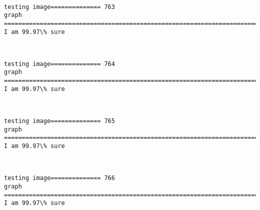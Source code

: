 \documentclass[11pt]{article}
\begin{document}
    \begin{center}
    \end{center}
    { \hspace*{\fill} \\}
    
    \begin{Verbatim}[commandchars=\\\{\}]
testing image============== 763
graph
============================================================================
I am 99.97\% sure

    \end{Verbatim}

    \begin{center}
    \end{center}
    { \hspace*{\fill} \\}
    
    \begin{Verbatim}[commandchars=\\\{\}]
testing image============== 764
graph
============================================================================
I am 99.97\% sure

    \end{Verbatim}

    \begin{center}
    \end{center}
    { \hspace*{\fill} \\}
    
    \begin{Verbatim}[commandchars=\\\{\}]
testing image============== 765
graph
============================================================================
I am 99.97\% sure

    \end{Verbatim}

    \begin{center}
    \end{center}
    { \hspace*{\fill} \\}
    
    \begin{Verbatim}[commandchars=\\\{\}]
testing image============== 766
graph
============================================================================
I am 99.97\% sure

    \end{Verbatim}
\end{document}
